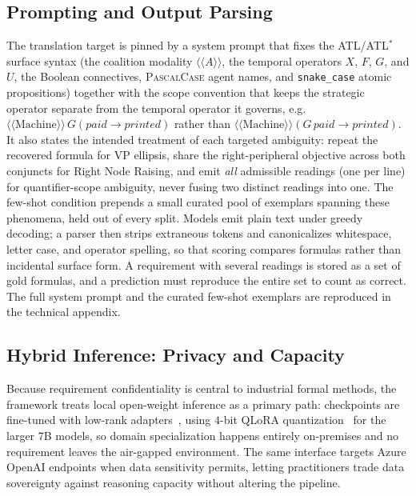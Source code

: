 \subsection{Prompting and Output Parsing}
\label{subsec:prompting}
The translation target is pinned by a system prompt that fixes the ATL/ATL$^\ast$ surface syntax (the coalition modality $\langle\!\langle A \rangle\!\rangle$, the temporal operators $X$, $F$, $G$, and $U$, the Boolean connectives, \textsc{PascalCase} agent names, and \texttt{snake\_case} atomic propositions) together with the scope convention that keeps the strategic operator separate from the temporal operator it governs, e.g.\ $\langle\!\langle \mathrm{Machine}\rangle\!\rangle\,G(\mathit{paid}\rightarrow \mathit{printed})$ rather than $\langle\!\langle \mathrm{Machine}\rangle\!\rangle(G\,\mathit{paid}\rightarrow \mathit{printed})$. It also states the intended treatment of each targeted ambiguity: repeat the recovered formula for VP ellipsis, share the right-peripheral objective across both conjuncts for Right Node Raising, and emit \emph{all} admissible readings (one per line) for quantifier-scope ambiguity, never fusing two distinct readings into one. The few-shot condition prepends a small curated pool of exemplars spanning these phenomena, held out of every split. Models emit plain text under greedy decoding; a parser then strips extraneous tokens and canonicalizes whitespace, letter case, and operator spelling, so that scoring compares formulas rather than incidental surface form. A requirement with several readings is stored as a set of gold formulas, and a prediction must reproduce the entire set to count as correct. The full system prompt and the curated few-shot exemplars are reproduced in the technical appendix.

\subsection{Hybrid Inference: Privacy and Capacity}
\label{subsec:hybrid}
Because requirement confidentiality is central to industrial formal methods, the framework treats local open-weight inference as a primary path: checkpoints are fine-tuned with low-rank adapters~\cite{hu2022lora}, using $4$-bit QLoRA quantization~\cite{dettmers2023qlora} for the larger $7$B models, so domain specialization happens entirely on-premises and no requirement leaves the air-gapped environment. The same interface targets Azure OpenAI endpoints when data sensitivity permits, letting practitioners trade data sovereignty against reasoning capacity without altering the pipeline.

